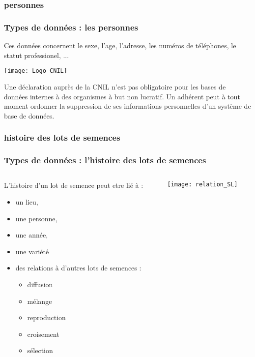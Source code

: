 \subsubsection{personnes}

\begin{frame}
\frametitle{Types de données : les personnes}

Ces données concernent le sexe, l'age, l'adresse, les numéros de téléphones, le statut professionel, ... 

\vfill

\texttt{[image: Logo\_CNIL]}

Une déclaration auprès de la CNIL n'est pas obligatoire pour les bases de données internes à des organismes à but non lucratif. 
Un adhérent peut à tout moment ordonner la suppression de ses informations personnelles d’un système de base de données.

\end{frame}

\subsubsection{histoire des lots de semences}

\begin{frame}
\frametitle{Types de données : l'histoire des lots de semences}

\begin{columns}

\begin{column}{.4\textwidth}

L'histoire d'un lot de semence peut etre lié à :
\begin{itemize}
\item un lieu,
\item une personne,
\item une année,
\item une variété
\item des relations à d'autres lots de semences :
	\begin{itemize}
	\item diffusion
	\item mélange
	\item reproduction
	\item croisement
	\item sélection
	\end{itemize}
\end{itemize}

\end{column}

\begin{column}{.6\textwidth}

\begin{center}
\texttt{[image: relation\_SL]} \tiny \cite{relation_SL}
\end{center}

\end{column}

\end{columns}

\end{frame}


